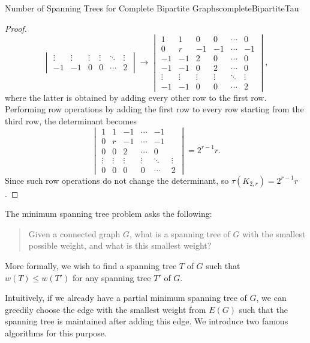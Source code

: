 \documentclass[math]{amznotes}
\theoremstyle{remark}
\newcommand{\0}{\mathbf{0}}
\newcommand{\1}{\mathbf{1}}
\begin{document}
\begin{probox}{Number of Spanning Trees for Complete Bipartite Graphs}{completeBipartiteTau}
\begin{proof}
\begin{equation*}
\begin{vmatrix}
                \vdots & \vdots & \vdots & \vdots & \ddots & \vdots \\
                -1 & -1 & 0 & 0 & \cdots & 2
            \end{vmatrix} \longrightarrow \begin{vmatrix}
                1 & 1 & 0 & 0 & \cdots & 0 \\
                0 & r & -1 & -1 & \cdots & -1 \\
                -1 & -1 & 2 & 0 & \cdots & 0 \\
                -1 & -1 & 0 & 2 & \cdots & 0 \\
                \vdots & \vdots & \vdots & \vdots & \ddots & \vdots \\
                -1 & -1 & 0 & 0 & \cdots & 2
            \end{vmatrix},
        \end{equation*}
        where the latter is obtained by adding every other row to the first row. Performing row operations by adding the first row to every row starting from the third row, the determinant becomes
        \begin{equation*}
            \begin{vmatrix}
                1 & 1 & -1 & \cdots & -1 \\
                0 & r & -1 & \cdots & -1 \\
                0 & 0 & 2 & \cdots & 0 \\
                \vdots & \vdots & \vdots & \vdots & \ddots & \vdots \\
                0 & 0 & 0 & 0 & \cdots & 2
            \end{vmatrix} = 2^{r - 1}r.
        \end{equation*}
        Since such row operations do not change the determinant, so $\tau(K_{2, r}) = 2^{r - 1}r$.
    \end{proof}
\end{probox}
The minimum spanning tree problem asks the following:
\begin{quote}
    Given a connected graph $G$, what is a spanning tree of $G$ with the smallest possible weight, and what is this smallest weight?
\end{quote}
More formally, we wish to find a spanning tree $T$ of $G$ such that $w(T) \leq w(T')$ for any spanning tree $T'$ of $G$.

Intuitively, if we already have a partial minimum spanning tree of $G$, we can greedily choose the edge with the smallest weight from $E(G)$ such that the spanning tree is maintained after adding this edge. We introduce two famous algorithms for this purpose.
\end{document}
